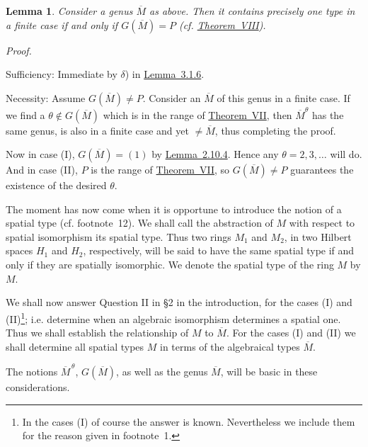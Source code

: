\documentclass[b5paper,twoside]{article}
\newcommand{\thmref}[2]{\hyperref[#1]{\mbox{Theorem~#2}}}
\newcommand{\lemref}[2]{\hyperref[#1]{\mbox{Lemma~#2}}}
\theoremstyle{mvnplain}
\newtheorem{lemma}{Lemma}[section]
\renewenvironment{proof}[1][Proof]{%
  \par\addvspace{0.35\baselineskip}%
  \noindent\textit{#1.}\ \normalfont\ignorespaces
}{%
  \par\addvspace{0.35\baselineskip}%
}
\newcommand{\M}{\mathbf M}
\newcommand{\Hilbert}{\mathfrak H}
\def\M{M}%
\def\Hilbert{H}%
\def\widetilde#1{#1}%
\def\mathfrak#1{#1}%
\begin{document}
\begin{lemma}\label{lem:3.2.3}
Consider a genus \(\widetilde{\overline{\M}}\) as above. Then it contains
precisely one type in a finite case if and only if
\(\mathfrak G(\widetilde{\overline{\M}})=P\) (cf.
\thmref{thm:VIII}{VIII}).
\end{lemma}

\begin{proof}
Sufficiency: Immediate by \(\delta\)) in \lemref{lem:3.1.6}{3.1.6}.

Necessity: Assume \(\mathfrak G(\widetilde{\overline{\M}})\ne P\).
Consider an \(\overline{\M}\) of this genus in a finite case. If we find a
\(\theta\notin\mathfrak G(\widetilde{\overline{\M}})\) which is in the range
of \thmref{thm:VII}{VII}, then \(\overline{\M}^{\theta}\) has the same genus,
is also in a finite case and yet \(\ne\overline{\M}\), thus completing the
proof.

Now in case (I),
\(\mathfrak G(\widetilde{\overline{\M}})=(1)\) by
\lemref{lem:2.10.4}{2.10.4}. Hence any \(\theta=2,3,\ldots\) will do. And in
case (II), \(P\) is the range of \thmref{thm:VII}{VII}, so
\(\mathfrak G(\widetilde{\overline{\M}})\ne P\) guarantees the existence of
the desired \(\theta\).
\end{proof}

The moment has now come when it is opportune to introduce the notion of a
spatial type (cf. footnote~12). We shall call the abstraction of \(\M\) with
respect to spatial isomorphism its spatial type. Thus two rings \(\M_1\) and
\(\M_2\), in two Hilbert spaces \(\Hilbert_1\) and \(\Hilbert_2\),
respectively, will be said to have the same spatial type if and only if they are
spatially isomorphic. We denote the spatial type of the ring \(\M\) by
\(\widetilde{\M}\).

We shall now answer Question II in \S2 in the introduction, for the cases (I)
and (II)\footnote{In the cases (I) of course the answer is known. Nevertheless
we include them for the reason given in footnote~1.}; i.e. determine when an
algebraic isomorphism determines a spatial one. Thus we shall establish the
relationship of \(\widetilde{\M}\) to \(\overline{\M}\). For the cases (I)
and (II) we shall determine all spatial types \(\widetilde{\M}\) in terms of
the algebraical types \(\overline{\M}\).

The notions \(\overline{\M}^{\,\theta}\),
\(\mathfrak G(\widetilde{\overline{\M}})\), as well as the genus
\(\widetilde{\overline{\M}}\), will be basic in these considerations.
\end{document}
